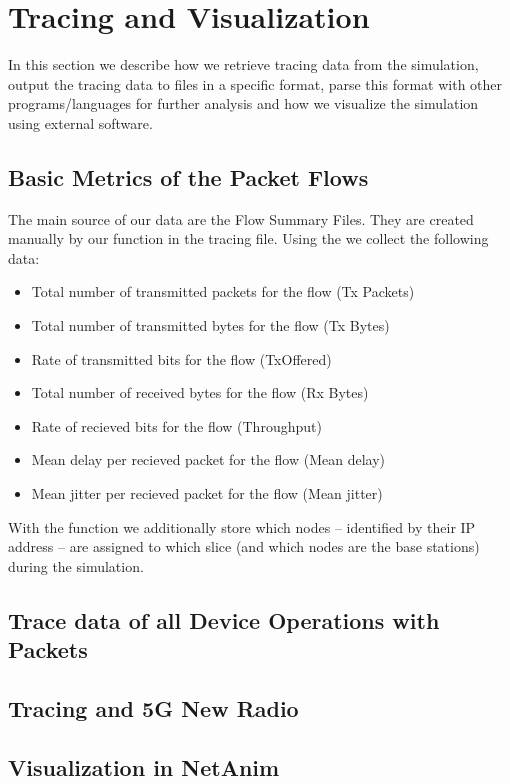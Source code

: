

\chapter{Tracing and Visualization}
\label{chapter:tracing}
In this section we describe how we retrieve tracing data from the simulation, output the tracing data to files in a specific format, parse this format with other programs/languages for further analysis and how we visualize the simulation using external software.

\section{Basic Metrics of the Packet Flows}
The main source of our data are the Flow Summary Files. They are created manually by our function  in the tracing file.
Using the  we collect the following data:
\begin{itemize}
	\item Total number of transmitted packets for the flow (Tx Packets)
	\item Total number of transmitted bytes for the flow (Tx Bytes)
	\item Rate of transmitted bits for the flow (TxOffered)
	\item Total number of received bytes for the flow (Rx Bytes)
	\item Rate of recieved bits for the flow (Throughput)
	\item Mean delay per recieved packet for the flow (Mean delay)
	\item Mean jitter per recieved packet for the flow (Mean jitter)
\end{itemize}

With the function  we additionally store which nodes -- identified by their IP address -- are assigned to which slice (and which nodes are the base stations) during the simulation.


\section{Trace data of all Device Operations with Packets}


\section{Tracing and 5G New Radio}
\section{Visualization in NetAnim}